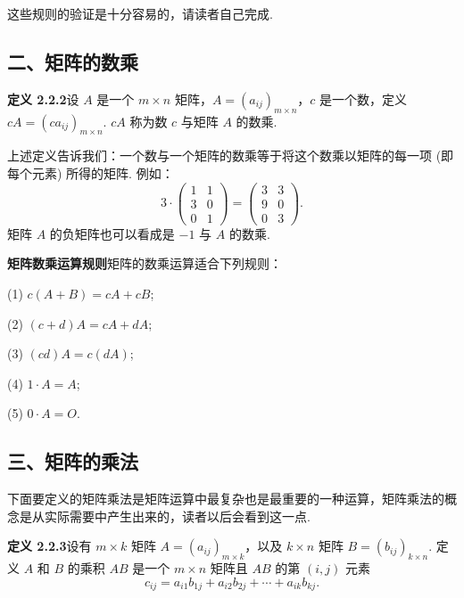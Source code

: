 \documentclass[UTF8,12pt,a4paper,fontset=fandol]{ctexart}
\begin{document}
这些规则的验证是十分容易的，请读者自己完成.

\subsection*{二、矩阵的数乘}

\noindent\textbf{定义 2.2.2}\quad 设 $A$ 是一个 $m\times n$ 矩阵，$A=(a_{ij})_{m\times n}$，$c$ 是一个数，定义 $cA=(ca_{ij})_{m\times n}$. $cA$ 称为数 $c$ 与矩阵 $A$ 的数乘.

上述定义告诉我们：一个数与一个矩阵的数乘等于将这个数乘以矩阵的每一项 (即每个元素) 所得的矩阵. 例如：
\[
3\cdot
\left(\begin{array}{cc}
1 & 1\\
3 & 0\\
0 & 1
\end{array}\right)
=
\left(\begin{array}{cc}
3 & 3\\
9 & 0\\
0 & 3
\end{array}\right).
\]
矩阵 $A$ 的负矩阵也可以看成是 $-1$ 与 $A$ 的数乘.

\noindent\textbf{矩阵数乘运算规则}\quad 矩阵的数乘运算适合下列规则：

(1) $c(A+B)=cA+cB$;

(2) $(c+d)A=cA+dA$;

(3) $(cd)A=c(dA)$;

(4) $1\cdot A=A$;

(5) $0\cdot A=O$.

\subsection*{三、矩阵的乘法}

下面要定义的矩阵乘法是矩阵运算中最复杂也是最重要的一种运算，矩阵乘法的概念是从实际需要中产生出来的，读者以后会看到这一点.

\noindent\textbf{定义 2.2.3}\quad 设有 $m\times k$ 矩阵 $A=(a_{ij})_{m\times k}$，以及 $k\times n$ 矩阵 $B=(b_{ij})_{k\times n}$. 定义 $A$ 和 $B$ 的乘积 $AB$ 是一个 $m\times n$ 矩阵且 $AB$ 的第 $(i,j)$ 元素
\[
c_{ij}=a_{i1}b_{1j}+a_{i2}b_{2j}+\cdots+a_{ik}b_{kj}.
\]
\end{document}
